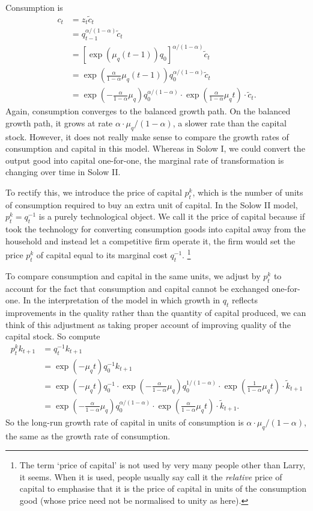 \documentclass[11pt,letterpaper,reqno,oneside]{article}
\begin{document}
Consumption is
%
\begin{align*}
	c_t
	&= z_t \widetilde{c}_t
	\\
	&= q_{t-1}^{\alpha/(1-\alpha)} \widetilde{c}_t
	\\
	&= \left[ \exp( \mu_q (t-1) ) q_0 \right]^{\alpha/(1-\alpha)} 
	\widetilde{c}_t 
	\\
	&= \exp\left( \tfrac{\alpha}{1-\alpha} \mu_q (t-1) \right) 
	q_0^{\alpha/(1-\alpha)} 
	\widetilde{c}_t 
	\\
	&= \exp\left( - \tfrac{\alpha}{1-\alpha} \mu_q \right)
	q_0^{\alpha/(1-\alpha)} 
	\cdot \exp\left( \tfrac{\alpha}{1-\alpha} \mu_q t \right) 
	\cdot \widetilde{c}_t .
\end{align*}
%
Again, consumption converges to the balanced growth path. On the balanced growth path, it grows at rate $\alpha \cdot \mu_q / (1-\alpha)$, a slower rate than the capital stock. However, it does not really make sense to compare the growth rates of consumption and capital in this model. Whereas in Solow I, we could convert the output good into capital one-for-one, the marginal rate of transformation is changing over time in Solow II.

To rectify this, we introduce the price of capital $p^k_t$, which is the number of units of consumption required to buy an extra unit of capital. In the Solow II model, $p^k_t = q_t^{-1}$ is a purely technological object. We call it the price of capital because if took the technology for converting consumption goods into capital away from the household and instead let a competitive firm operate it, the firm would set the price $p^k_t$ of capital equal to its marginal cost $q_t^{-1}$.%
	\footnote{The term `price of capital' is not used by very many people other than Larry, it seems. When it is used, people usually say call it the \emph{relative} price of capital to emphasise that it is the price of capital in units of the consumption good (whose price need not be normalised to unity as here).}

To compare consumption and capital in the same units, we adjust by $p^k_t$ to account for the fact that consumption and capital cannot be exchanged one-for-one. In the interpretation of the model in which growth in $q_t$ reflects improvements in the quality rather than the quantity of capital produced, we can think of this adjustment as taking proper account of improving quality of the capital stock. So compute
%
\begin{align*}
	p^k_t k_{t+1} 
	&= q_t^{-1} k_{t+1} 
	\\
	&= \exp( - \mu_q t ) q_0^{-1} k_{t+1} 
	\\
	&= \exp( - \mu_q t ) q_0^{-1} 
	\cdot \exp\left( - \tfrac{\alpha}{1-\alpha} \mu_q \right) 
	q_0^{1/(1-\alpha)}
	\cdot \exp\left( \tfrac{1}{1-\alpha} \mu_q t \right) 
	\cdot \widetilde{k}_{t+1}
	\\
	&= \exp\left( - \tfrac{\alpha}{1-\alpha} \mu_q \right) 
	q_0^{\alpha/(1-\alpha)}
	\cdot \exp\left( \tfrac{\alpha}{1-\alpha} \mu_q t \right) 
	\cdot \widetilde{k}_{t+1} .
\end{align*}
%
So the long-run growth rate of capital in units of consumption is $\alpha \cdot \mu_q / (1-\alpha)$, the same as the growth rate of consumption.
\end{document}
